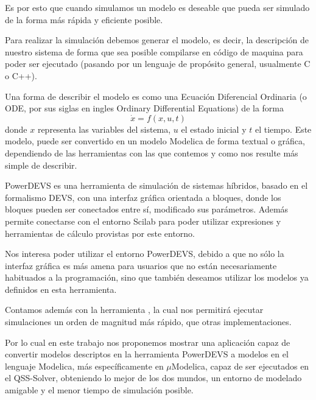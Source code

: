 Es por esto que cuando simulamos un modelo es deseable que pueda ser simulado de la forma más rápida y eficiente posible.

Para realizar la simulación debemos generar el modelo, es decir, la descripción de nuestro sistema de forma que sea posible compilarse en código de maquina para poder ser ejecutado (pasando por un lenguaje de propósito general, usualmente C o C++). 

Una forma de describir el modelo es como una Ecuación Diferencial Ordinaria (o ODE, por sus siglas en ingles Ordinary Differential Equations) de la forma
\begin{equation*}
	\dot{x} = f(x, u, t)
\end{equation*}
donde $x$ representa las variables del sistema, $u$ el estado inicial y $t$ el tiempo. Este modelo, puede ser convertido en un modelo Modelica\cite{Fri98}\cite{Fritzson02modelica} de forma textual o gráfica, dependiendo de las herramientas con las que contemos y como nos resulte más simple de describir.

PowerDEVS\cite{BK11} es una herramienta de simulación de sistemas híbridos, basado en el formalismo DEVS\cite{Zeigler}, con una interfaz gráfica orientada a bloques, donde los bloques pueden ser conectados entre sí, modificado sus parámetros. Además permite conectarse con el entorno Scilab para poder utilizar expresiones y herramientas de cálculo provistas por este entorno.

Nos interesa poder utilizar el entorno PowerDEVS, debido a que no sólo la interfaz gráfica es más amena para usuarios que no están necesariamente habituados a la programación, sino que también deseamos utilizar los modelos ya definidos en esta herramienta.

Contamos además con la herramienta \cite{Ber12}, la cual nos permitirá ejecutar simulaciones un orden de magnitud más rápido, que otras implementaciones.

Por lo cual en este trabajo nos proponemos mostrar una aplicación capaz de convertir modelos descriptos en la herramienta PowerDEVS a modelos en el lenguaje Modelica, más específicamente en $\mu$Modelica\cite{Ber12}, capaz de ser ejecutados en el QSS-Solver, obteniendo lo mejor de los dos mundos, un entorno de modelado amigable y el menor tiempo de simulación posible.


